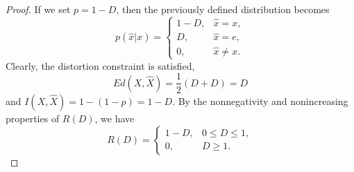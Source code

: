 \documentclass[
  coursecode={MTHE 477},
  assignmentname={Homework \homeworknumber},
  studentnumber=20053722,
  name={Bryan Hoang},
  draft,
]{
  ltxanswer%
}
\begin{document}
\begin{questions}
\begin{solution}
\begin{claim}
\begin{proof}
          If we set \(p = 1-D\), then the previously defined distribution becomes
          \begin{equation*}
            p(\hat{x}|x) = \begin{cases}
              1 - D, &\hat{x} = x,   \\
              D,     &\hat{x} = e,   \\
              0,     &\hat{x} \ne x.
            \end{cases}
          \end{equation*}
          Clearly, the distortion constraint is satisfied,
          \begin{equation*}
            Ed(X,\hat{X}) = \frac{1}{2}(D + D) = D
          \end{equation*}
          and \(I(X,\hat{X}) = 1 - (1 - p) = 1 - D\). By the nonnegativity and nonincreasing properties of \(R(D)\), we have
          \begin{equation*}
            R(D) = \begin{cases}
              1 - D, &0 \le D \le 1, \\
              0,     &D \ge 1.
            \end{cases}
          \end{equation*}
        \end{proof}
      \end{claim}
    \end{solution}
  \end{questions}
\end{document}

